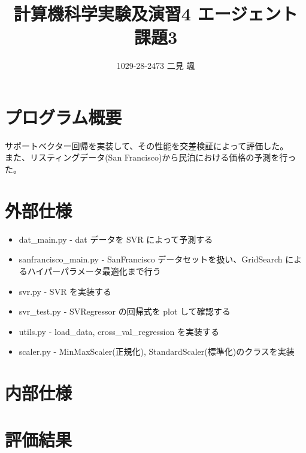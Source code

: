 \documentclass{jsarticle}
\begin{document}
\title{計算機科学実験及演習4 エージェント 課題3}
\author{1029-28-2473 二見 颯}
\maketitle

\section{プログラム概要}
サポートベクター回帰を実装して、その性能を交差検証によって評価した。 \\
また、リスティングデータ(San Francisco)から民泊における価格の予測を行った。

\section{外部仕様}
\begin{itemize}
    \item dat\_main.py - dat データを SVR によって予測する
    \item sanfrancisco\_main.py - SanFrancisco データセットを扱い、GridSearch によるハイパーパラメータ最適化まで行う
    \item svr.py - SVR を実装する
    \item svr\_test.py - SVRegressor の回帰式を plot して確認する
    \item utils.py - load\_data, cross\_val\_regression を実装する 
    \item scaler.py - MinMaxScaler(正規化), StandardScaler(標準化)のクラスを実装
\end{itemize}

\section{内部仕様}

\section{評価結果}
\end{document}
